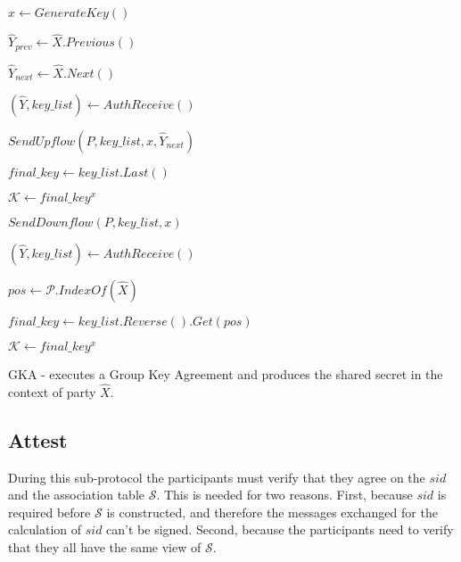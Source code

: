 \begin{algorithm}[H]
  \Begin
  {
    $x \leftarrow GenerateKey()$

    $\hat{Y}_{prev} \leftarrow \hat{X}.Previous()$

    $\hat{Y}_{next} \leftarrow \hat{X}.Next()$   

    \Else
    {
      $(\hat{Y}, key\_list) \leftarrow AuthReceive()$

      {
      }
      {
        $SendUpflow(P, key\_list, x, \hat{Y}_{next})$
      }
      \Else
      {
        $final\_key \leftarrow key\_list.Last()$

        $\mathcal{K} \leftarrow final\_key^x$

        $SendDownflow(P, key\_list, x)$

      }
    }

    $(\hat{Y}, key\_list) \leftarrow AuthReceive()$

    {
    }
    
    $pos \leftarrow \mathcal{P}.IndexOf(\hat{X})$

    $final\_key \leftarrow key\_list.Reverse().Get(pos)$

    $\mathcal{K} \leftarrow final\_key^x$

  }
  \caption{GKA - executes a Group Key Agreement and produces the shared secret in the context of party $\hat{X}$.}
  \label{gka_proto_algo}
\end{algorithm}

\subsection{Attest}
\label{subsections:attest}
During this sub-protocol the participants must verify that they agree on the $sid$ and the association table $\mathcal{S}$. This is needed for two reasons. First, because $sid$ is required before $\mathcal{S}$ is constructed, and therefore the messages exchanged for the calculation of $sid$ can't be signed. Second, because the participants need to verify that they all have the same view of $\mathcal{S}$.

